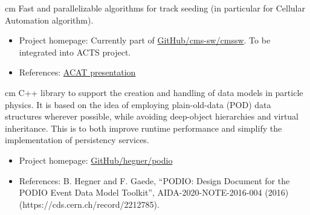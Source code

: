  cm  
Fast and parallelizable algorithms for track seeding (in particular for Cellular Automation algorithm).
\begin{itemize}
\item Project homepage: Currently part of \href{https://github.com/cms-sw/cmssw}{GitHub/cms-sw/cmssw}. To be integrated into ACTS project.
\item References: \href{https://indico.cern.ch/event/567550/contributions/2627138/attachments/1512745/2359625/201708_Felice_ACAT17.pptx}{ACAT presentation} 
\end{itemize}

 cm 
C++ library to support the creation and handling of data models in particle physics. It is based on the idea of employing plain-old-data (POD) data structures wherever possible, while avoiding deep-object hierarchies and virtual inheritance. This is to both improve runtime performance and simplify the implementation of persistency services.
\begin{itemize}
\item Project homepage: \href{https://github.com/hegner/podio}{GitHub/hegner/podio} 
\item References: B. Hegner and F. Gaede, “PODIO: Design Document for the PODIO Event Data Model Toolkit”, AIDA-2020-NOTE-2016-004 (2016) (https://cds.cern.ch/record/2212785). 
\end{itemize}
